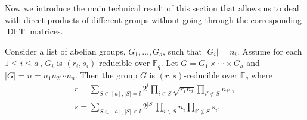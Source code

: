 \documentclass{toc}
\newcommand\F{{\mathbb{F}}}
\DeclareMathOperator{\DFT}{DFT}
\begin{document}
Now we introduce the main technical result of this section that allows us to deal with direct products of different groups without going through the corresponding $\DFT$ matrices.
\begin{claim}\label{productrigidity}
%
%
Consider a list of
abelian  %
groups, $G_1, \dots , G_a$, such that $|G_i| = n_i$.  
Assume  
for each $1 \leq i \leq a$\,, $G_i$ is $(r_i,s_i)$-reducible over $\F_q$.
Let %
$G = G_1 \times \cdots \times G_a$   %
and $|G| = n = n_1n_2 \cdots n_a$.  Then the group $G$ is $(r,s)$-reducible over $\F_q$ where 
\begin{align*}
    r = \sum_{S \subset [a], |S| = l} 2^l\prod_{i \in S} \sqrt{r_i n_i} \prod_{i' \notin S} n_{i'}\,, \\
    s = \sum_{S \subset[a], |S| < l} 2^{|S|}\prod_{i \in S} n_i \prod_{i' \notin S} s_{i'} \,.
\end{align*}
\end{claim}
\end{document}
